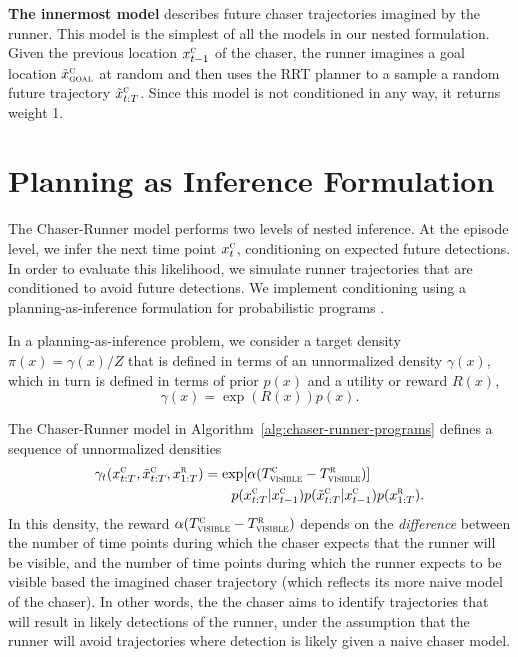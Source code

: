 \documentclass[twoside]{article}
\begin{document}
\textbf{The innermost model} describes future chaser trajectories imagined by the runner. This model is the simplest of all the models in our nested formulation. Given the previous location $x^\textsc{c}_{t-1}$ of the chaser, the runner imagines a goal location $\tilde{x}^\textsc{c}_\textsc{goal}$ at random and then uses the RRT planner to a sample a random future trajectory $\tilde{x}^\textsc{c}_{t:T}$. Since this model is not conditioned in any way, it returns weight 1.

\section{Planning as Inference Formulation}

The Chaser-Runner model performs two levels of nested inference. At the episode level, we infer the next time point $x^\textsc{c}_t$, conditioning on expected future detections. In order to evaluate this likelihood, we simulate runner trajectories that are conditioned to avoid future detections. We implement conditioning using a planning-as-inference formulation for probabilistic programs \cite{toussaint06,vandemeent2016black-box}. 

In a planning-as-inference problem, we consider a target density $\pi(x) = \gamma(x) / Z$ that is defined in terms of an unnormalized density $\gamma(x)$, which in turn is defined in terms of prior $p(x)$ and a utility or reward $R(x)$,
\begin{equation}
    \gamma(x) = \exp(R(x)) p(x).
\end{equation}

The Chaser-Runner model in Algorithm~\ref{alg:chaser-runner-programs} defines a sequence of unnormalized densities 
\begin{align*}
    \gamma_t(x^\textsc{c}_{t:T}, \tilde{x}^\textsc{c}_{t:T}, x^\textsc{r}_{1:T})
    &=
    \exp[\alpha (T^\textsc{c}_\textsc{visible} - T^\textsc{r}_\textsc{visible} )] 
    \\
    &~~~~~~
    p(x^\textsc{c}_{t:T} | x^\textsc{c}_{t-1})
    p(\tilde{x}^\textsc{c}_{t:T} | x^\textsc{c}_{t-1})
    p(x^\textsc{r}_{1:T}).
\end{align*}
In this density, the reward $\alpha (T^\textsc{c}_\textsc{visible} - T^\textsc{r}_\textsc{visible})$ depends on the \emph{difference} between the number of time points during which the chaser expects that the runner will be visible, and the number of time points during which the runner expects to be visible based the imagined chaser trajectory (which reflects its more naive model of the chaser). In other words, the the chaser aims to identify trajectories that will result in likely detections of the runner, under the assumption that the runner will avoid trajectories where detection is likely given a naive chaser model. 
\end{document}
